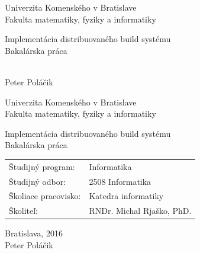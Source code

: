 \documentclass[12pt, oneside]{book}
\def\mfrok{2016}
\def\mfnazov{Implement\'{a}cia distribuovan\'{e}ho build syst\'{e}mu}
\def\mftyp{Bakalárska práca}
\def\mfautor{Peter Pol\'{a}\v{c}ik}
\def\mfskolitel{RNDr. Michal Rja\v{s}ko, PhD.}
\def\mfmiesto{Bratislava, \mfrok}
\def\mfodbor{2508 Informatika}
\def\program{ Informatika }
\def\mfpracovisko{ Katedra informatiky }
\begin{document}
\thispagestyle{empty}

\begin{center}
\sc\large
Univerzita Komenského v Bratislave\\
Fakulta matematiky, fyziky a informatiky

\vfill

{\LARGE\mfnazov}\\
\mftyp
\end{center}

\vfill

{\sc\large
\noindent \mfrok\\
\mfautor
}

\eject %


\thispagestyle{empty}
\noindent

\begin{center}
\sc
\large
Univerzita Komenského v Bratislave\\
Fakulta matematiky, fyziky a informatiky

\vfill

{\LARGE\mfnazov}\\
\mftyp
\end{center}

\vfill

\noindent
\begin{tabular}{ll}
Študijný program: & \program \\
Študijný odbor: & \mfodbor \\
Školiace pracovisko: & \mfpracovisko \\
Školiteľ: & \mfskolitel \\
\end{tabular}

\vfill


\noindent \mfmiesto\\
\mfautor

\eject %




\end{document}
